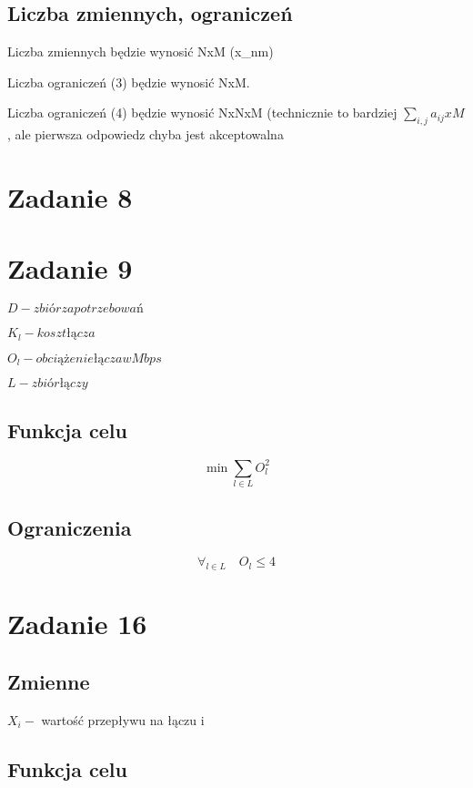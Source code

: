 \documentclass{article}
\begin{document}
\subsection{Liczba zmiennych, ograniczeń}

Liczba zmiennych będzie wynosić NxM (x_{nm})

Liczba ograniczeń (3) będzie wynosić NxM.

Liczba ograniczeń (4) będzie wynosić NxNxM (technicznie to bardziej $\sum_{i,j} a_{ij} x M$, ale pierwsza odpowiedz chyba jest akceptowalna


\section{Zadanie 8}


\section{Zadanie 9}

$D - zbiór zapotrzebowań$

$K_l - koszt łącza$

$O_l - obciążenie łącza w Mbps$

$L - zbiór łączy$

\subsection{Funkcja celu}
\begin{equation}
\min \sum_{l \in L} O_l^2
\end{equation}


\subsection{Ograniczenia}

\begin{equation}
  \forall_{l \in L} \quad O_l \leq 4
\end{equation}

\section{Zadanie 16}


\subsection{Zmienne}
$X_i - $ wartość przepływu na łączu i

\subsection{Funkcja celu}
\end{document}
